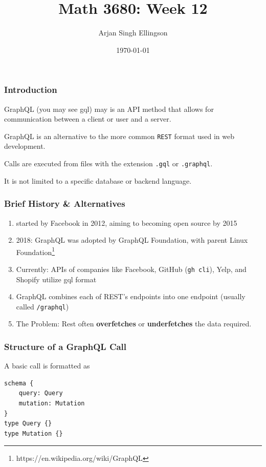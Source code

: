 \documentclass{beamer}
\title{Math 3680: Week 12}
\author{Arjan Singh Ellingson}
\date{\today}
\institute[Cal Poly]{California Polytechnic State University}
\begin{document}


\begin{frame}
    \maketitle
\end{frame}

\begin{frame}
    \frametitle{Introduction}
    GraphQL (you may see gql) may is an API method that allows for communication between a client or user and a server.

    GraphQL is an alternative to the more common \texttt{REST} format used in web development.

    Calls are executed from files with the extension \texttt{.gql} or \texttt{.graphql}.

    It is not limited to a specific database or backend language.
\end{frame}

\begin{frame}
    \frametitle{Brief History \& Alternatives}
    \begin{enumerate}
        \item<1->started by Facebook in 2012, aiming to becoming open source by 2015
        \item<2->2018: GraphQL was adopted by GraphQL Foundation, with parent Linux Foundation\footnote{https://en.wikipedia.org/wiki/GraphQL}

        \item<3->Currently: APIs of companies like Facebook, GitHub (\texttt{gh cli}), Yelp, and Shopify utilize gql format
        \item<4->GraphQL combines each of REST's endpoints into one endpoint (usually called \texttt{/graphql})
        \item<5->The Problem: Rest often \textbf{overfetches} or \textbf{underfetches} the data required.
    \end{enumerate}
\end{frame}

\begin{frame}[fragile]
    \frametitle{Structure of a GraphQL Call}
    A basic call is formatted as
    \begin{verbatim}     
schema {     
    query: Query     
    mutation: Mutation     
}     
type Query {}     
type Mutation {}     
\end{verbatim}
\end{frame}
\end{document}
